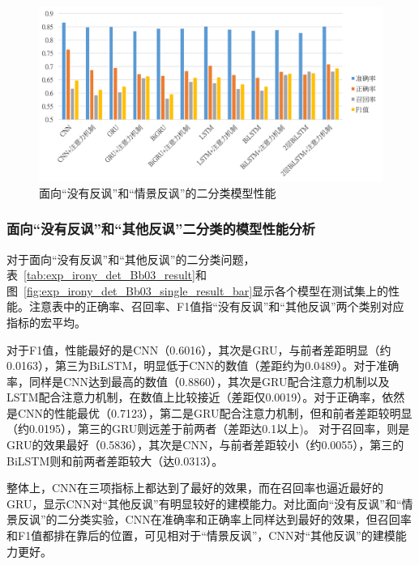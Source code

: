 \begin{figure}[H]
  \centering
  \includegraphics[width=\textwidth]{img/exp_irony_det_Bb02_single_result_bar.png}
  \caption{面向“没有反讽”和“情景反讽”的二分类模型性能}
  \label{fig:exp_irony_det_Bb02_single_result_bar}
\end{figure}

\subsubsection{面向“没有反讽”和“其他反讽”二分类的模型性能分析}
\label{sssec:exp_irony_det_Bb03_base}

对于面向“没有反讽”和“其他反讽”的二分类问题，表~\ref{tab:exp_irony_det_Bb03_result}和图~\ref{fig:exp_irony_det_Bb03_single_result_bar}显示各个模型在测试集上的性能。注意表中的正确率、召回率、F1值指“没有反讽”和“其他反讽”两个类别对应指标的宏平均。

对于F1值，性能最好的是CNN（0.6016），其次是GRU，与前者差距明显（约0.0163），第三为BiLSTM，明显低于CNN的数值（差距约为0.0489）。对于准确率，同样是CNN达到最高的数值（0.8860），其次是GRU配合注意力机制以及LSTM配合注意力机制，在数值上比较接近（差距仅0.0019）。对于正确率，依然是CNN的性能最优（0.7123），第二是GRU配合注意力机制，但和前者差距较明显（约0.0195），第三的GRU则远差于前两者（差距达0.1以上)。 对于召回率，则是GRU的效果最好（0.5836），其次是CNN，与前者差距较小（约0.0055），第三的BiLSTM则和前两者差距较大（达0.0313）。

整体上，CNN在三项指标上都达到了最好的效果，而在召回率也逼近最好的GRU，显示CNN对“其他反讽”有明显较好的建模能力。对比面向“没有反讽”和“情景反讽”的二分类实验，CNN在准确率和正确率上同样达到最好的效果，但召回率和F1值都排在靠后的位置，可见相对于“情景反讽”，CNN对“其他反讽”的建模能力更好。 

